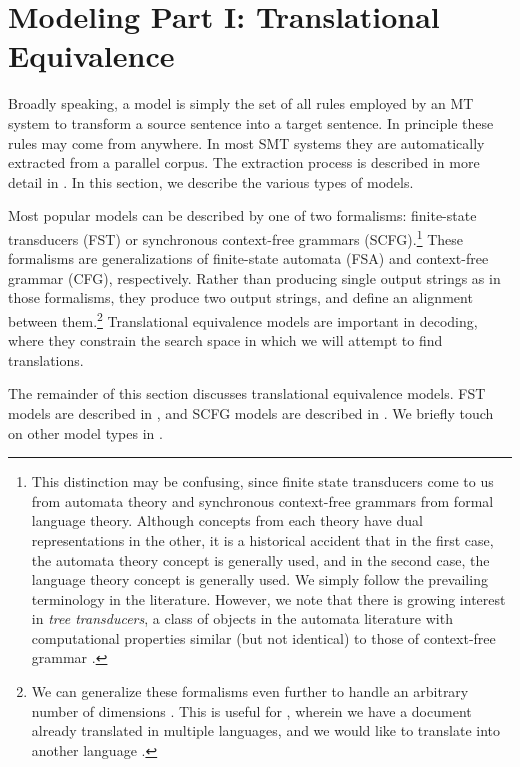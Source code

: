 \section{Modeling Part I: Translational Equivalence}\label{sec:translational-equivalence-models}

Broadly speaking, 
a  model is simply the set of
all rules employed by an MT system to transform a source
sentence into a target sentence.  In principle
these rules may come from anywhere.  In most SMT systems
they are automatically extracted from a 
parallel corpus.  The extraction process is described in
more detail in .  In this 
section, we describe the various types of models.

Most popular models
can be described by one of two formalisms:
finite-state transducers (FST) or 
synchronous context-free grammars (SCFG).\footnote{
This distinction may be confusing, since finite
state transducers come to us from automata theory
and synchronous context-free grammars from formal language
theory.  Although concepts from each theory have dual
representations in the other, it is a historical accident
that in the first case, the automata theory concept
is generally used, and in the second case, the language theory
concept is generally used.  We simply follow the prevailing
terminology in the literature.  However, we note that there is growing 
interest in {\em tree transducers}, a class of objects in the
automata literature with computational properties similar
(but not identical) to those of context-free grammar
\citep{Knight:2005:cicling,Galley:2006:acl,Marcu:2006:emnlp}.}
These formalisms are generalizations of finite-state
automata (FSA) and context-free grammar (CFG), respectively.
Rather than producing single output strings
as in those formalisms, they produce two output strings,
and define an alignment between them.\footnote{We 
can generalize these formalisms even further
to handle an arbitrary number of dimensions 
\citep{Melamed:2003:naacl-main}.
This is useful for , wherein
we have a document already translated in multiple languages, and
we would like to translate into another language \citet{Och:2001:mtsummit-multi}.}
Translational equivalence models are important
in decoding, where they constrain the search
space in which we will attempt to find translations.

The remainder of this section discusses 
translational equivalence
models.  FST models are 
described in ,
and SCFG models are described in 
.
We briefly touch on other model types in
.


